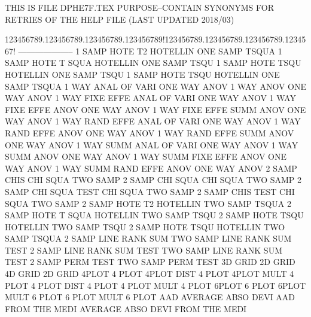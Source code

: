 THIS IS FILE DPHE7F.TEX
PURPOSE--CONTAIN SYNONYMS FOR RETRIES OF THE HELP FILE (LAST UPDATED 2018/03)
 
123456789.123456789.123456789.123456789!123456789.123456789.123456789.1234567!
--------------------
1        SAMP HOTE T2                   HOTELLIN ONE  SAMP TSQUA
1        SAMP HOTE T    SQUA            HOTELLIN ONE  SAMP TSQU
1        SAMP HOTE TSQU                 HOTELLIN ONE  SAMP TSQU
1        SAMP HOTE TSQU                 HOTELLIN ONE  SAMP TSQUA
1        WAY  ANAL OF   VARI            ONE      WAY  ANOV
1        WAY  ANOV                      ONE      WAY  ANOV
1        WAY  FIXE EFFE ANAL OF   VARI  ONE      WAY  ANOV
1        WAY  FIXE EFFE ANOV            ONE      WAY  ANOV
1        WAY  FIXE EFFE SUMM ANOV       ONE      WAY  ANOV
1        WAY  RAND EFFE ANAL OF   VARI  ONE      WAY  ANOV
1        WAY  RAND EFFE ANOV            ONE      WAY  ANOV
1        WAY  RAND EFFE SUMM ANOV       ONE      WAY  ANOV
1        WAY  SUMM ANAL OF   VARI       ONE      WAY  ANOV
1        WAY  SUMM ANOV                 ONE      WAY  ANOV
1        WAY  SUMM FIXE EFFE ANOV       ONE      WAY  ANOV
1        WAY  SUMM RAND EFFE ANOV       ONE      WAY  ANOV
2        SAMP CHIS                      CHI      SQUA TWO  SAMP
2        SAMP CHI  SQUA                 CHI      SQUA TWO  SAMP
2        SAMP CHI  SQUA TEST            CHI      SQUA TWO  SAMP
2        SAMP CHIS TEST                 CHI      SQUA TWO  SAMP
2        SAMP HOTE T2                   HOTELLIN TWO  SAMP TSQUA
2        SAMP HOTE T    SQUA            HOTELLIN TWO  SAMP TSQU
2        SAMP HOTE TSQU                 HOTELLIN TWO  SAMP TSQU
2        SAMP HOTE TSQU                 HOTELLIN TWO  SAMP TSQUA
2        SAMP LINE RANK SUM             TWO      SAMP LINE RANK SUM TEST
2        SAMP LINE RANK SUM  TEST       TWO      SAMP LINE RANK SUM TEST
2        SAMP PERM TEST                 TWO      SAMP PERM TEST
3D       GRID                           2D       GRID
4D       GRID                           2D       GRID
4PLOT                                   4        PLOT
4PLOT    DIST                           4        PLOT
4PLOT    MULT                           4        PLOT
4        PLOT DIST                      4        PLOT
4        PLOT MULT                      4        PLOT
6PLOT                                   6        PLOT
6PLOT    MULT                           6        PLOT
6        PLOT MULT                      6        PLOT
AAD                                     AVERAGE  ABSO DEVI
AAD      FROM THE  MEDI                 AVERAGE  ABSO DEVI FROM THE  MEDI
